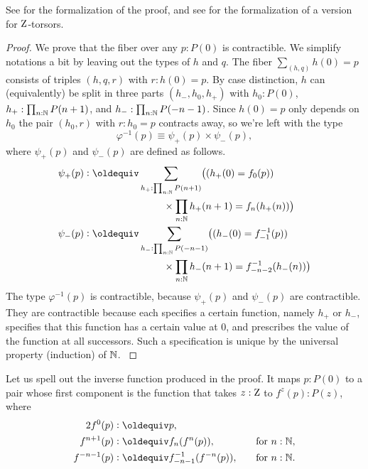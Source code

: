\documentclass[a4paper,12pt]{amsart}
\begin{document}
See \cite[\href{https://github.com/UniMath/UniMath/blob/c856a5/UniMath/SyntheticHomotopyTheory/AffineLine.v\#L167}{AffineLine.v, commit c856a5, line 167}]{UniMath}
for the formalization of the proof, and
see \cite[\href{https://github.com/UniMath/UniMath/blob/c856a5/UniMath/SyntheticHomotopyTheory/AffineLine.v\#L242}{AffineLine.v, commit c856a5, line 242}]{UniMath}
for the formalization of a version for $\mathrm{Z}$-torsors.

\begin{proof}
  We prove that the fiber over any $p : P(0)$ is contractible.
  We simplify notations a bit by leaving out the types of $h$ and $q$.
  The fiber $\sum_{(h,q)} h(0)=p$ consists of triples $(h,q,r)$ with $r : h(0) = p$.
  By case distinction, $h$ can (equivalently) be split in three parts $(h_-,h_0,h_+)$
  with $h_0 : P(0)$, $h_+ : \prod_{n:\mathbb{N}}P(n+1)$,  and $h_- : \prod_{n:\mathbb{N}} P(-n-1)$.
  Since $h(0)=p$ only depends on $h_0$ the pair $(h_0,r)$ with  $r : h_0 = p$
  contracts away, so we're left with the type
  $$ \varphi^{-1}(p) \equiv \psi_+(p) \times \psi_-(p), $$
  \bgroup
  where $\psi_+(p)$ and $\psi_-(p)$ are defined as follows.
  \begin{align*}
    \psi_+(p) & \defeq  \sum_{h_+ : \prod_{n:\NN}P(n+1)}  \bigl((h_+(0) = f_0(p))         \\
    & \hspace {8em} \times \prod_{n:\NN}h_+(n+1) = f_n(h_+(n))\bigr) \\
    \psi_-(p) & \defeq  \sum_{h_- : \prod_{n:\NN}P(-n-1)} \bigl((h_-(0) = f_{-1}^{-1}(p))  \\
    & \hspace {8em} \times \prod_{n:\NN}h_-(n+1) = f_{-n-2}^{-1}(h_-(n))\bigr)
  \end{align*}
  The type $\varphi^{-1}(p)$ is contractible, because $\psi_+(p)$ and $\psi_-(p)$ are contractible.
  They are contractible because each specifies a certain function, namely $h_+$ or $h_-$,
  specifies that this function has a certain value at $0$,
  and prescribes the value of the function at all successors.
  Such a specification is unique by the universal property (induction) of $\mathbb{N}$.
  \egroup
\end{proof}

Let us spell out the inverse function produced in the proof.
It maps $p : P(0)$ to a pair whose first component
is the function that takes $z:\mathrm{Z}$ to $f^z(p):P(z)$, where
\begin{alignat*}2
  f^0(p) &\defeq p, && \\
  f^{n+1}(p) &\defeq f_n(f^n(p)),&\quad&\text{for $n:\NN$,} \\
  f^{-n-1}(p) &\defeq f_{-n-1}^{-1}(f^{-n}(p)),&\quad&\text{for $n:\NN$.}
\end{alignat*}
\end{document}
